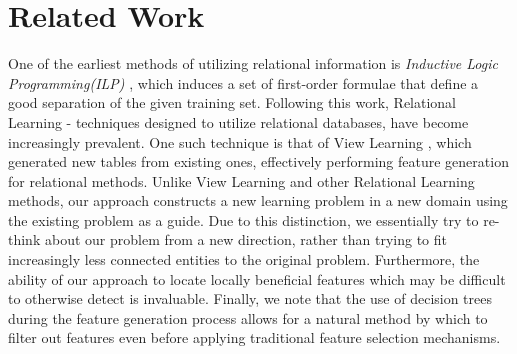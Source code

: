 \documentclass[twoside,11pt]{article}
\theoremstyle{definition}
\begin{document}




\section{Related Work}
One of the earliest methods of utilizing relational information is \emph{Inductive Logic Programming(ILP)} \cite{quinlan1990learning,muggleton1991inductive}, which induces a set of first-order formulae that define a good separation of the given training set.
Following this work, Relational Learning - techniques designed to utilize relational databases, have become increasingly prevalent. One such technique is that of View Learning \cite{davis2005view}, which generated new tables from existing ones, effectively performing feature generation for relational methods.
Unlike View Learning and other Relational Learning methods, our approach constructs a new learning problem in a new domain using the existing problem as a guide. Due to this distinction, we essentially try to re-think about our problem from a new direction, rather than trying to fit increasingly less connected entities to the original problem. Furthermore, the ability of our approach to locate locally beneficial features which may be difficult to otherwise detect is invaluable. Finally, we note that the use of decision trees during the feature generation process allows for a natural method by which to filter out features even before applying traditional feature selection mechanisms.
\end{document}
